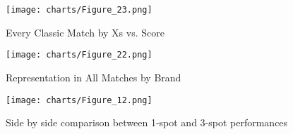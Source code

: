 \documentclass{article}
\begin{document}
\begin{figure}[h]
    \centering
    \texttt{[image: charts/Figure\_23.png]}
    \caption{Every Classic Match by Xs vs. Score}
    \label{fig:figure8}
\end{figure}

\begin{figure}[h]
    \centering
    \texttt{[image: charts/Figure\_22.png]}
    \caption{Representation in All Matches by Brand}
    \label{fig:figure9}
\end{figure}

\begin{figure}[h]
    \centering
    \texttt{[image: charts/Figure\_12.png]}
    \caption{Side by side comparison between 1-spot and 3-spot performances}
    \label{fig:figure10}
\end{figure}
\end{document}

